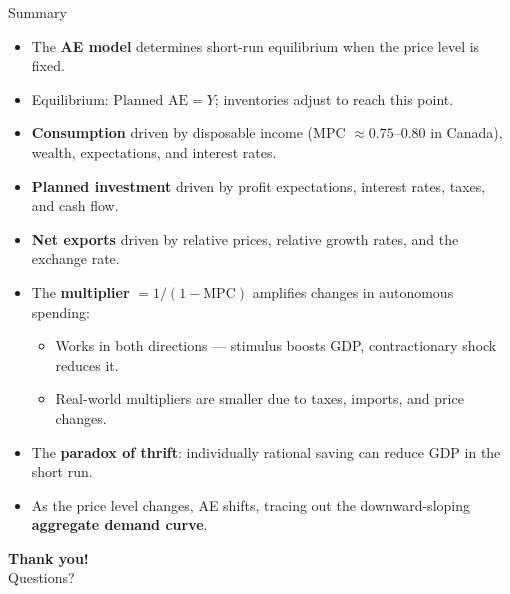 \documentclass[aspectratio=169]{beamer}
\begin{document}
\begin{frame}{Summary}
\transfade
\begin{itemize}
  \item The \textbf{AE model} determines short-run equilibrium when the price level is fixed.
  \item Equilibrium: $\text{Planned AE} = Y$; inventories adjust to reach this point.
  \item \textbf{Consumption} driven by disposable income (MPC $\approx 0.75$--$0.80$ in Canada), wealth, expectations, and interest rates.
  \item \textbf{Planned investment} driven by profit expectations, interest rates, taxes, and cash flow.
  \item \textbf{Net exports} driven by relative prices, relative growth rates, and the exchange rate.
  \item The \textbf{multiplier} $= 1/(1-\text{MPC})$ amplifies changes in autonomous spending:
  \begin{itemize}
    \item Works in both directions --- stimulus boosts GDP, contractionary shock reduces it.
    \item Real-world multipliers are smaller due to taxes, imports, and price changes.
  \end{itemize}
  \item The \textbf{paradox of thrift}: individually rational saving can reduce GDP in the short run.
  \item As the price level changes, AE shifts, tracing out the downward-sloping \textbf{aggregate demand curve}.
\end{itemize}
\end{frame}

\begin{frame}
\centering
\Huge \textbf{Thank you!}\\[1em]
\large Questions?
\end{frame}
\end{document}
